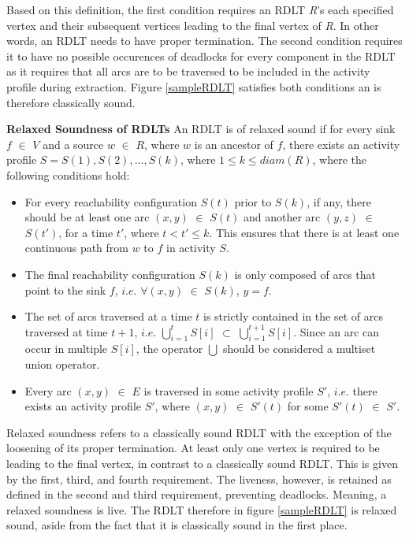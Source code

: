 Based on this definition, the first condition requires an RDLT \emph{R}'s each specified vertex and their subsequent vertices leading to the final vertex of \emph{R}. In other words, an RDLT needs to have proper termination. 
The second condition requires it to have no possible occurences of deadlocks for every component in the RDLT as it requires that all arcs are to be traversed to be included in the activity profile during extraction. Figure \ref{sampleRDLT} satisfies both conditions an is therefore classically sound.

\begin{defn}\textbf{Relaxed Soundness of RDLTs} \cite{Malinao2017, MalinaoPJS2023, Sulla2023}
    \label{RelaxedRDLTDef}
    An RDLT is of relaxed sound if for every sink $ f $ $ \in $ $ V $ and a source $ w $ $ \in $ $ R $, where $ w $ is an ancestor of $ f $, there exists an activity profile $ S = {S(1), S(2), ..., S(k)} $, where $ 1 \leq k \leq diam(R) $, where the following conditions hold:
    \begin{itemize}
        \item For every reachability configuration $ S(t) $ prior to $ S(k) $, if any, there should be at least one arc $ (x,y) $ $ \in $ $ S(t) $ and another arc $ (y,z) $ $ \in $ $ S(t') $, for a time $ t' $, where $ t < t' \leq k $. This ensures that there is at least one continuous path from $ w $ to $ f $ in activity $ S $.
        \item The final reachability configuration $ S(k) $ is only composed of arcs that point to the sink $ f $, $ i.e. $ $ \forall (x,y) $ $ \in $ $ S(k) $, $ y = f $.
        \item The set of arcs traversed at a time $ t $ is strictly contained in the set of arcs traversed at time $ t + 1 $, $ i.e. $ $ \bigcup_{i=1}^{t} S[i] $ $ \subset $ $ \bigcup_{i=1}^{t+1} S[i] $. Since an arc can occur in multiple $ S[i] $, the operator $ \bigcup $ should be considered a multiset union operator.
        \item Every arc $ (x,y) $ $ \in $ $ E $ is traversed in some activity profile $ S' $, $ i.e. $ there exists an activity profile $ S' $, where $ (x,y) $ $ \in $ $ S'(t) $ for some $ S'(t) $ $ \in $ $ S' $.
    \end{itemize}
\end{defn}
Relaxed soundness refers to a classically sound RDLT with the exception of the loosening of its proper termination. At least only one vertex is required to be leading to the final vertex, in contrast to a classically sound RDLT. This is given by the first, third, and fourth requirement. The liveness, however, is retained as defined in the second and third requirement, preventing deadlocks. Meaning, a relaxed soundness is live.  The RDLT therefore in figure \ref{sampleRDLT} is relaxed sound, aside from the fact that it is classically sound in the first place.

